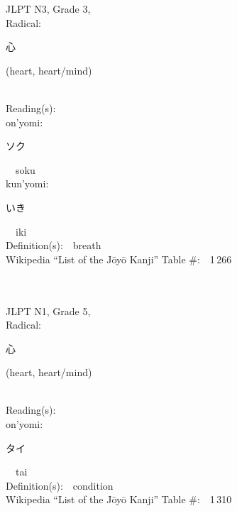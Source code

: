 \begin{multicols}{2}
{JLPT N3, Grade 3, \\Radical:\ \ {\begin{CJK}{UTF8}{min} 心 \end{CJK}} (heart, heart/mind) } \\
Reading(s):\ \ \\
{\hspace*{1em}}on'yomi:\ \ \\
{\hspace*{2em}}{\begin{CJK}{UTF8}{min} ソク \end{CJK}}\ \ soku\ \ \\
{\hspace*{1em}}kun'yomi:\ \ \\
{\hspace*{2em}}{\begin{CJK}{UTF8}{min} いき \end{CJK}}\ \ iki\ \ \\
Definition(s):\ \ breath \\
Wikipedia ``List of the J\=oy\=o Kanji'' Table \#:\ \ 1\,266 \\
\ \ \\
{\fontsize{34pt}{40pt}  }\ \ \\  %
{JLPT N1, Grade 5, \\Radical:\ \ {\begin{CJK}{UTF8}{min} 心 \end{CJK}} (heart, heart/mind) } \\
Reading(s):\ \ \\
{\hspace*{1em}}on'yomi:\ \ \\
{\hspace*{2em}}{\begin{CJK}{UTF8}{min} タイ \end{CJK}}\ \ tai\ \ \\
Definition(s):\ \ condition \\
Wikipedia ``List of the J\=oy\=o Kanji'' Table \#:\ \ 1\,310 \\
\ \ \\
{\fontsize{34pt}{40pt}  }\ \ \\  %

\end{multicols}
